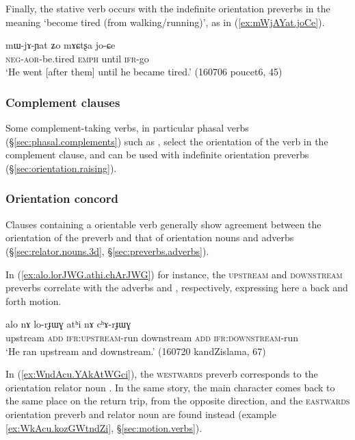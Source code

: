 Finally, the stative verb  occurs with the indefinite orientation preverbs in the meaning `become tired (from walking/running)', as in (\ref{ex:mWjAYat.joCe}).

\begin{exe}
\ex \label{ex:mWjAYat.joCe}
\gll mɯ-jɤ-ɲat ʑo mɤɕtʂa jo-ɕe \\
\textsc{neg}-\textsc{aor}-be.tired \textsc{emph} until \textsc{ifr}-go \\
\glt `He went [after them] until he became tired.' (160706 poucet6, 45)
\end{exe}

\subsubsection{Complement clauses} \label{sec:orientation.complement.clause}
Some complement-taking verbs, in particular phasal verbs (§\ref{sec:phasal.complements}) such as , select the orientation of the verb in the complement clause, and can be used with indefinite orientation preverbs (§\ref{sec:orientation.raising}). 

\subsubsection{Orientation concord} \label{sec:orientation.concord}
Clauses containing a orientable verb generally show agreement between the orientation of the preverb and that of orientation nouns and adverbs
(§\ref{sec:relator.nouns.3d}, §\ref{sec:preverbs.adverbs}). 

In (\ref{ex:alo.lorJWG.athi.chArJWG}) for instance, the \textsc{upstream}  and  \textsc{downstream} preverbs   correlate with the adverbs  and , respectively, expressing here a back and forth motion.

\begin{exe}
	\ex \label{ex:alo.lorJWG.athi.chArJWG}
	\gll alo nɤ lo-rɟɯɣ atʰi nɤ cʰɤ-rɟɯɣ \\
	upstream \textsc{add} \textsc{ifr}:\textsc{upstream}-run 	downstream \textsc{add} \textsc{ifr}:\textsc{downstream}-run  \\
	\glt `He ran upstream and downstream.' (160720 kandZislama, 67)
\end{exe}

In (\ref{ex:WndAcu.YAkAtWGci}), the \textsc{westwards}  preverb corresponds to the orientation relator noun . In the same story, the main character comes back to the same place on the return trip, from the opposite direction, and the \textsc{eastwards} orientation preverb and relator noun are found instead (example \ref{ex:WkAcu.kozGWtndZi}, §\ref{sec:motion.verbs}).


